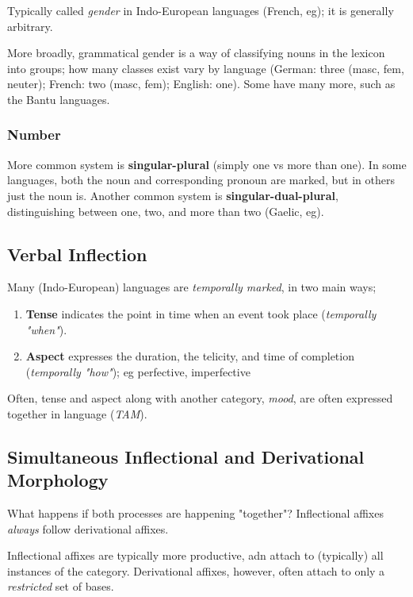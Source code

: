 \documentclass[12pt]{article}
\begin{document}
Typically called \textit{gender} in Indo-European languages (French, eg); it is generally arbitrary.

More broadly, grammatical gender is a way of classifying nouns in the lexicon into groups; how many classes exist vary by language (German: three (masc, fem, neuter); French: two (masc, fem); English: one). Some have many more, such as the Bantu languages.

\subsubsection{Number}

More common system is \textbf{singular-plural} (simply one vs more than one). In some languages, both the noun and corresponding pronoun are marked, but in others just the noun is. Another common system is \textbf{singular-dual-plural}, distinguishing between one, two, and more than two (Gaelic, eg).

\subsection{Verbal Inflection}

Many (Indo-European) languages are \textit{temporally marked}, in two main ways; 

\begin{enumerate}
  \item \textbf{Tense} indicates the point in time when an event took place (\textit{temporally "when"}).
  \item \textbf{Aspect} expresses the duration, the telicity, and time of completion (\textit{temporally "how"}); eg perfective, imperfective
\end{enumerate}

Often, tense and aspect along with another category, \textit{mood}, are often expressed together in language (\textit{TAM}).

\subsection{Simultaneous Inflectional and Derivational Morphology}

What happens if both processes are happening "together"? Inflectional affixes \textit{always} follow derivational affixes.

Inflectional affixes are typically more productive, adn attach to (typically) all instances of the category. Derivational affixes, however, often attach to only a \textit{restricted} set of bases.
\end{document}
